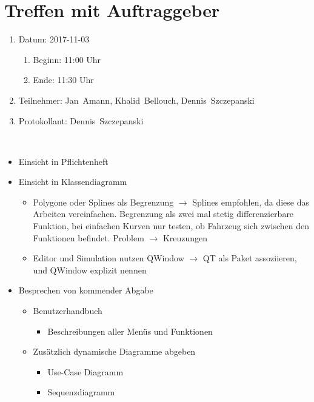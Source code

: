 \pagebreak
\section[Treffen mit Auftraggeber - 2017-11-03]{Treffen mit Auftraggeber}

\begin{enumerate}
	\item Datum: 2017-11-03
	\begin{enumerate}[label*=\arabic*.]
		\item Beginn: 11:00 Uhr
		\item Ende: 11:30 Uhr
	\end{enumerate}
	
	\item Teilnehmer:
	\subitem Jan~Amann, Khalid~Bellouch, Dennis~Szczepanski
	
	\item Protokollant: Dennis~Szczepanski
\end{enumerate}
\ \\

\begin{itemize}
	\item Einsicht in Pflichtenheft 
	\item Einsicht in Klassendiagramm
	\begin{itemize}
		\item Polygone oder Splines als Begrenzung $\rightarrow$ Splines empfohlen, da diese das Arbeiten vereinfachen. Begrenzung als zwei mal stetig differenzierbare Funktion, bei einfachen Kurven nur testen, ob Fahrzeug sich zwischen den Funktionen befindet. Problem $\rightarrow$ Kreuzungen
		\item Editor und Simulation nutzen QWindow $\rightarrow$ QT als Paket assoziieren, und QWindow explizit nennen
	\end{itemize}
	\item Besprechen von kommender Abgabe
	\begin{itemize}
		\item Benutzerhandbuch
		\begin{itemize}
			\item Beschreibungen aller Menüs und Funktionen
		\end{itemize}
		\item Zusätzlich dynamische Diagramme abgeben
		\begin{itemize}
			\item Use-Case Diagramm
			\item Sequenzdiagramm
		\end{itemize}
	\end{itemize}
\end{itemize}